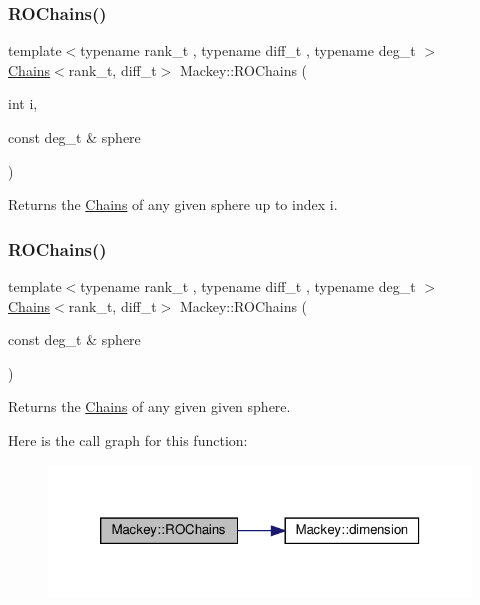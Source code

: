 \subsubsection{\texorpdfstring{R\+O\+Chains()}{ROChains()}\hspace{0.1cm}{\footnotesize\ttfamily [1/2]}}
{\footnotesize\ttfamily template$<$typename rank\+\_\+t , typename diff\+\_\+t , typename deg\+\_\+t $>$ \\
\hyperlink{classMackey_1_1Chains}{Chains}$<$rank\+\_\+t, diff\+\_\+t$>$ Mackey\+::\+R\+O\+Chains (\begin{DoxyParamCaption}\item[{int}]{i,  }\item[{const deg\+\_\+t \&}]{sphere }\end{DoxyParamCaption})}



Returns the \hyperlink{classMackey_1_1Chains}{Chains} of any given sphere up to index i. 

\mbox{\label{namespaceMackey_abd3c2e12c91baa573c6dbaa37eeb0518}} 
\subsubsection{\texorpdfstring{R\+O\+Chains()}{ROChains()}\hspace{0.1cm}{\footnotesize\ttfamily [2/2]}}
{\footnotesize\ttfamily template$<$typename rank\+\_\+t , typename diff\+\_\+t , typename deg\+\_\+t $>$ \\
\hyperlink{classMackey_1_1Chains}{Chains}$<$rank\+\_\+t, diff\+\_\+t$>$ Mackey\+::\+R\+O\+Chains (\begin{DoxyParamCaption}\item[{const deg\+\_\+t \&}]{sphere }\end{DoxyParamCaption})}



Returns the \hyperlink{classMackey_1_1Chains}{Chains} of any given given sphere. 

Here is the call graph for this function\+:\nopagebreak
\begin{figure}[H]
\begin{center}
\leavevmode
\includegraphics[width=320pt]{namespaceMackey_abd3c2e12c91baa573c6dbaa37eeb0518_cgraph}
\end{center}
\end{figure}
\mbox{\label{namespaceMackey_a2bd86833844ca62d76c47a54aeb0bb77}} 

